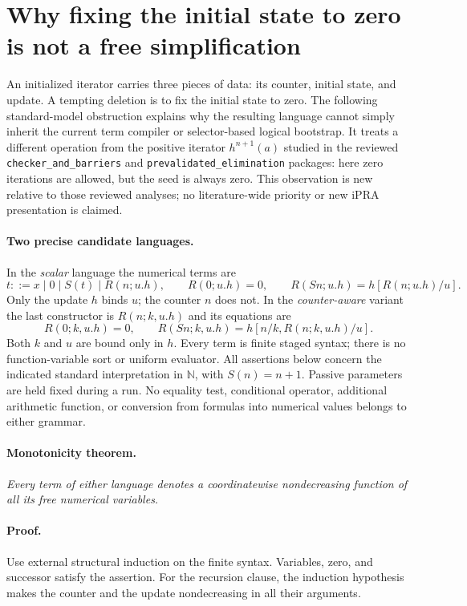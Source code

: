 \section{Why fixing the initial state to zero is not a free simplification}
\label{sec:zero-start-obstruction}

An initialized iterator carries three pieces of data: its counter, initial
state, and update. A tempting deletion is to fix the initial state to zero.
The following standard-model obstruction explains why the resulting language
cannot simply inherit the current term compiler or selector-based logical
bootstrap. It treats a different operation from the positive iterator
$h^{n+1}(a)$ studied in the reviewed \texttt{checker\_and\_barriers} and
\texttt{prevalidated\_elimination} packages: here zero iterations are allowed,
but the seed is always zero. This observation is new relative to those
reviewed analyses; no literature-wide priority or new iPRA presentation is
claimed.

\paragraph{Two precise candidate languages.}
In the \emph{scalar} language the numerical terms are
\[
 t ::= x\mid 0\mid S(t)\mid R(n;u.h),
 \qquad
 R(0;u.h)=0,\qquad R(Sn;u.h)=h[R(n;u.h)/u].
 \tag{ZS}
\]
Only the update $h$ binds $u$; the counter $n$ does not. In the
\emph{counter-aware} variant the last constructor is $R(n;k,u.h)$ and its
equations are
\[
 R(0;k,u.h)=0,\qquad
 R(Sn;k,u.h)=h[n/k,R(n;k,u.h)/u].
 \tag{ZC}
\]
Both $k$ and $u$ are bound only in $h$. Every term is finite staged syntax;
there is no function-variable sort or uniform evaluator. All assertions
below concern the indicated standard interpretation in $\mathbb N$, with
$S(n)=n+1$. Passive parameters are held fixed during a run. No equality
test, conditional operator, additional arithmetic function, or conversion
from formulas into numerical values belongs to either grammar.

\paragraph{Monotonicity theorem.}
\emph{Every term of either language denotes a coordinatewise nondecreasing
function of all its free numerical variables.}

\paragraph{Proof.}
Use external structural induction on the finite syntax. Variables, zero,
and successor satisfy the assertion. For the recursion clause, the
induction hypothesis makes the counter and the update nondecreasing in
all their arguments.

